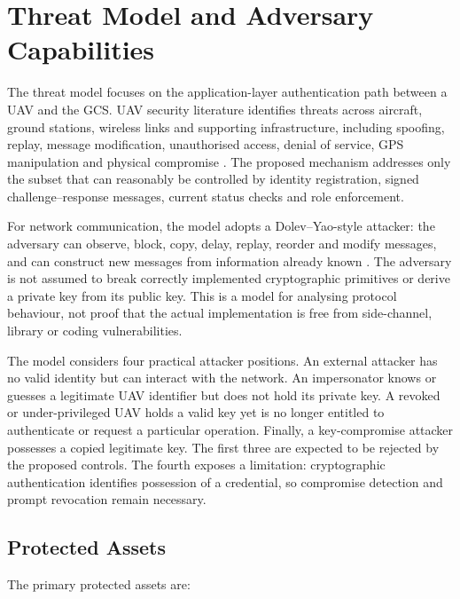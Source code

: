 \section{Threat Model and Adversary Capabilities}
\label{sec:threat-model}

The threat model focuses on the application-layer authentication path between a UAV and the GCS. UAV security literature identifies threats across aircraft, ground stations, wireless links and supporting infrastructure, including spoofing, replay, message modification, unauthorised access, denial of service, GPS manipulation and physical compromise \cite{Tsao2022UAVSurvey}. The proposed mechanism addresses only the subset that can reasonably be controlled by identity registration, signed challenge--response messages, current status checks and role enforcement.

For network communication, the model adopts a Dolev--Yao-style attacker: the adversary can observe, block, copy, delay, replay, reorder and modify messages, and can construct new messages from information already known \cite{DolevYao1983}. The adversary is not assumed to break correctly implemented cryptographic primitives or derive a private key from its public key. This is a model for analysing protocol behaviour, not proof that the actual implementation is free from side-channel, library or coding vulnerabilities.

The model considers four practical attacker positions. An external attacker has no valid identity but can interact with the network. An impersonator knows or guesses a legitimate UAV identifier but does not hold its private key. A revoked or under-privileged UAV holds a valid key yet is no longer entitled to authenticate or request a particular operation. Finally, a key-compromise attacker possesses a copied legitimate key. The first three are expected to be rejected by the proposed controls. The fourth exposes a limitation: cryptographic authentication identifies possession of a credential, so compromise detection and prompt revocation remain necessary.

\subsection{Protected Assets}
\label{subsec:protected-assets}

The primary protected assets are:


